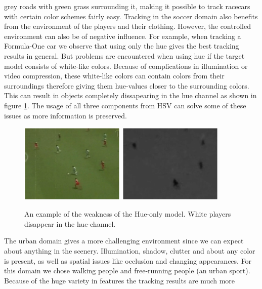 \documentclass[a4paper,11pt]{article}
\begin{document}
		grey roads with green grass surrounding it, making it possible to track racecars with certain
		color schemes fairly easy. Tracking in the soccer domain also benefits from the environment of
		the players and their clothing. However, the controlled environment can also be of negative
		influence. For example, when tracking a Formula-One car we observe that using only the hue gives
		the best tracking results in general. But problems are encountered when using hue if the target
		model consists of white-like colors. Because of complications in illumination or video compression,
		these white-like colors can contain colors from their surroundings therefore giving them hue-values
		closer to the surrounding colors. This can result in objects completely dissapearing in the hue channel
		as shown in figure \ref{fig:HUE}. The usage of all three components from HSV can solve some of these
		issues as more information is preserved.
		\begin{figure}[H]
			\begin{center}
				\includegraphics[width=5cm]{img/example_hue1.eps}
				\includegraphics[width=5cm]{img/example_hue2.eps}\\
			\end{center}
			\caption{
				An example of the weakness of the Hue-only model.
				White players disappear in the hue-channel.
			}
			\label{fig:HUE}
		\end{figure}
		\noindent
		The urban domain gives a more challenging environment since we can expect about anything in the
		scenery. Illumination, shadow, clutter and about any color is present, as well as spatial issues
		like occlusion and changing appearances. For this domain we chose walking people and free-running
		people (an urban sport). Because of the huge variety in features the tracking results are much more
\end{document}
